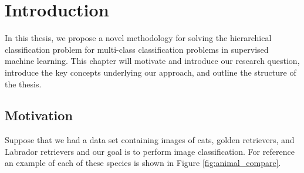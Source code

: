 \documentclass[draft, ../thesis.tex]{subfiles}
\begin{document}
    \chapter{Introduction}
    
    In this thesis, we propose a novel methodology for solving the hierarchical classification problem for multi-class classification problems in supervised machine learning. This chapter will motivate and introduce our research question, introduce the key concepts underlying our approach, and outline the structure of the thesis.
    
    \section{Motivation}
    \label{motivation}
    Suppose that we had a data set containing images of cats, golden retrievers, and Labrador retrievers and our goal is to perform image classification. For reference an example of each of these species is shown in Figure \ref{fig:animal_compare}. 
    
\end{document}
